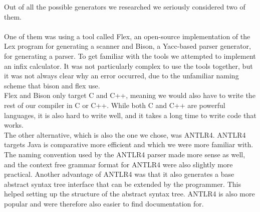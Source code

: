 \noindent
Out of all the possible generators we researched we seriously considered two of them. \\
\\
One of them was using a tool called Flex, an open-source implementation of the Lex program for generating a scanner and Bison, a Yacc-based parser generator, for generating a parser. To get familiar with the tools we attempted to implement an infix calculator. It was not particularly complex to use the tools together, but it was not always clear why an error occurred, due to the unfamiliar naming scheme that bison and flex use. \\
Flex and Bison only target C and C++, meaning we would also have to write the rest of our compiler in C or C++. While both C and C++ are powerful languages, it is also hard to write well, and it takes a long time to write code that works. \\
The other alternative, which is also the one we chose, was ANTLR4. ANTLR4 targets Java is comparative more efficient and which we were more familiar with. The naming convention used by the ANTLR4 parser made more sense as well, and the context free grammar format for ANTLR4 were also slightly more practical. Another advantage of ANTLR4 was that it also generates a base abstract syntax tree interface that can be extended by the programmer. This helped setting up the structure of the abstract syntax tree. ANTLR4 is also more popular and were therefore also easier to find documentation for. 







